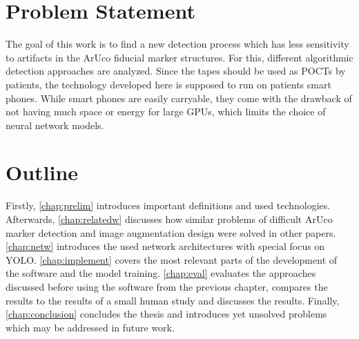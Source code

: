 \documentclass[10pt]{book}
\begin{document}

\section{Problem Statement}

The goal of this work is to find a new detection process which has less sensitivity to artifacts in the \ac{ArUco} fiducial marker structures. For this, different algorithmic detection approaches are analyzed. Since the tapes should be used as \acp{POCT} by patients, the technology developed here is supposed to run on patients smart phones. While smart phones are easily carryable, they come with the drawback of not having much space or energy for large \acp{GPU}, which limits the choice of neural network models.

\section{Outline}

Firstly, \autoref{chap:prelim} introduces important definitions and used technologies. Afterwards, \autoref{chap:relatedw} discusses how similar problems of difficult \ac{ArUco} marker detection and image augmentation design were solved in other papers. \autoref{chap:netw} introduces the used network architectures with special focus on \ac{YOLO}. \autoref{chap:implement} covers the most relevant parts of the development of the software and the model training. \autoref{chap:eval} evaluates the approaches discussed before using the software from the previous chapter, compares the results to the results of a small human study and discusses the results. Finally, \autoref{chap:conclusion} concludes the thesis and introduces yet unsolved problems which may be addressed in future work.
\end{document}
